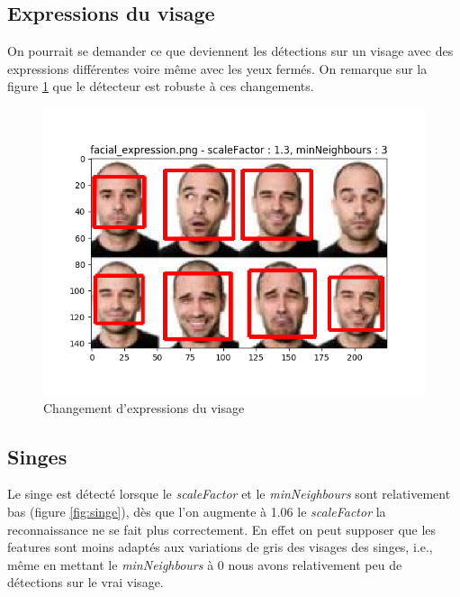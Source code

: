 \documentclass[a4paper,11pt]{article}
\begin{document}
    \subsection{Expressions du visage}
	
	On pourrait se demander ce que deviennent les détections sur un visage avec des expressions
	différentes voire même avec les yeux fermés. On remarque sur la figure \ref{fig:visage_exp}
	que le détecteur est robuste à ces changements.

	\begin{figure}[H]
	    \begin{center}
		\includegraphics[scale = 0.6]{images/facial_expression_1,3_3.png}
		\caption{Changement d'expressions du visage}
		\label{fig:visage_exp}
	    \end{center}
	\end{figure}

    
    \subsection{Singes}

	Le singe est détecté lorsque le	\textit{scaleFactor} et le \textit{minNeighbours} sont
	relativement bas (figure \ref{fig:singe}), dès que l'on augmente à 1.06 le
	\textit{scaleFactor} la reconnaissance ne se fait plus correctement.
	En effet on peut supposer que les features sont moins
	adaptés aux variations de gris des visages des singes, i.e., même en mettant le
	\textit{minNeighbours} à 0 nous avons relativement peu de détections sur le vrai visage.
\end{document}
